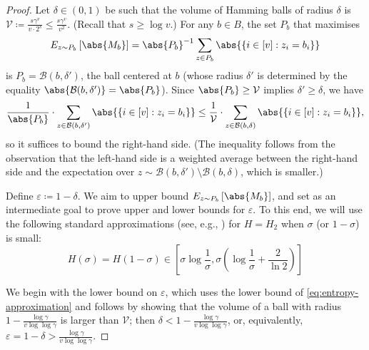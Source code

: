 \documentclass[a4paper,UKenglish,cleveref, autoref, thm-restate]{lipics-v2021}
\theoremstyle{definition}
\renewcommand{\set}[1]{\left\{#1\right\}}
\newcommand{\eps}{\varepsilon}
\newcommand{\vcommitlength}{v}
\newcommand{\vcommitstring}{z}
\newcommand{\ball}{\mathcal B}
\newcommand{\alphabetsize}{\gamma}
\begin{document}
\begin{proof}
    Let $\delta \in (0,1)$ be such that the volume of Hamming balls of radius $\delta$ is $\mathcal{V} \coloneqq \frac{s \alphabetsize^\vcommitlength}{\vcommitlength \cdot 2^s} \leq \frac{s \alphabetsize^\vcommitlength}{\vcommitlength^2}$. (Recall that $s \geq \log \vcommitlength$.) For any $b \in B$, the set $P_b$ that maximises
    \begin{equation*}
        E_{\vcommitstring \sim P_b}\left[\abs{M_b}\right] = \abs{P_b}^{-1} \sum_{\vcommitstring \in P_b} \abs{\set{i \in [\vcommitlength] : \vcommitstring_i = b_i}}
    \end{equation*}
    is $P_b = \ball(b, \delta')$, the ball centered at $b$ (whose radius $\delta'$ is determined by the equality $\abs{\ball(b, \delta')} = \abs{P_b}$). Since $\abs{P_b} \geq \mathcal{V}$ implies $\delta' \geq \delta$, we have
    \begin{equation*}
        \frac1{\abs{P_b}} \cdot \sum_{\vcommitstring \in \ball(b, \delta')} \abs{\set{i \in [\vcommitlength] : \vcommitstring_i = b_i}} \leq \frac1{\mathcal{V}} \cdot \sum_{\vcommitstring \in \ball(b, \delta)} \abs{\set{i \in [\vcommitlength] : \vcommitstring_i = b_i}},
    \end{equation*}
    so it suffices to bound the right-hand side. (The inequality follows from the observation that the left-hand side is a weighted average between the right-hand side and the expectation over $\vcommitstring \sim \ball(b, \delta') \setminus \ball(b, \delta)$, which is smaller.)
    
    Define $\eps \coloneqq 1 - \delta$. We aim to upper bound $E_{\vcommitstring \sim P_b}\left[\abs{M_b}\right]$, and set as an intermediate goal to prove upper and lower bounds for $\eps$. To this end, we will use the following standard approximations (see, e.g., \cite{GRS12}) for $H = H_2$ when $\sigma$ (or $1 - \sigma$) is small:
    \begin{equation}
        \label{eq:entropy-approximation}
        H(\sigma) = H(1 - \sigma) \in \left[\sigma \log \frac1{\sigma}, \sigma \left(\log \frac1{\sigma} + \frac{2}{\ln 2}\right)\right]
    \end{equation}

    We begin with the lower bound on $\eps$, which uses the lower bound of \cref{eq:entropy-approximation}  and follows by showing that the volume of a ball with radius $1 - \frac{\log \alphabetsize}{\vcommitlength \log\log \alphabetsize}$ is larger than $\mathcal{V}$; then $\delta < 1 - \frac{\log \alphabetsize}{\vcommitlength \log\log \alphabetsize}$, or, equivalently, $\eps = 1 - \delta > \frac{\log \alphabetsize}{\vcommitlength \log\log \alphabetsize}$.
    

\end{proof}
\end{document}
